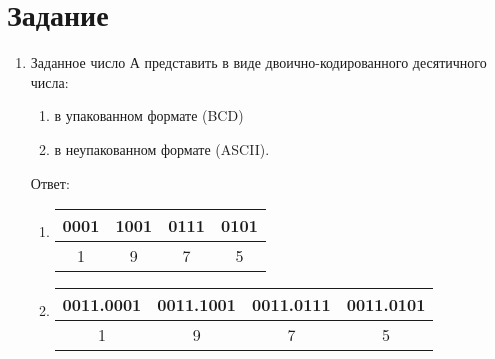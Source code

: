 \documentclass{article}
\begin{document}
\section{Задание}
\begin{enumerate}
      \item Заданное число А представить в виде двоично-кодированного десятичного числа:
            \begin{enumerate}
                  \item в упакованном формате (BCD)
                  \item в неупакованном формате (ASCII).
            \end{enumerate}
            
            Ответ: \begin{enumerate}
                  \item \begin{tabular}{|c|c|c|c|}
                              \hline
                              0001 & 1001 & 0111 & 0101 \\
                              \hline
                              1    & 9    & 7    & 5    \\ 
                              \hline
                        \end{tabular}
                  \item \begin{tabular}{|c|c|c|c|}
                              \hline
                              0011.0001 & 0011.1001 & 0011.0111 & 0011.0101 \\
                              \hline
                              1         & 9         & 7         & 5         \\ 
                              \hline
                        \end{tabular}
            \end{enumerate}
            

\end{enumerate}
\end{document}
